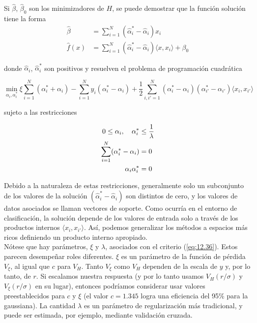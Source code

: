 Si $\hat{\beta}$, $\hat{\beta}_0$ son los minimizadores de $H$, se puede demostrar que la función solución tiene la forma 
\begin{align}
\hat{\beta} &= \sum_{i=1}^{N} (\hat{\alpha}^*_i - \hat{\alpha}_i) x_i \\
\hat{f}(x) &= \sum_{i=1}^{N} (\hat{\alpha}^*_i - \hat{\alpha}_i) \langle x, x_i \rangle + \beta_0 
\end{align}

\noindent donde $\hat{\alpha}_i$, $\hat{\alpha}^*_i$ son positivos y resuelven el problema de programación cuadrática

\begin{equation}
\min_{\alpha_i, \alpha^*_i} \xi \sum_{i=1}^{N} (\alpha^*_i + \alpha_i) - \sum_{i=1}^{N} y_i (\alpha^*_i - \alpha_i) + \frac{1}{2} \sum_{i,i'=1}^{N} (\alpha^*_i - \alpha_i)(\alpha^*_{i'} - \alpha_{i'}) \langle x_i, x_{i'} \rangle
\end{equation}

\noindent sujeto a las restricciones

\begin{align}
0 \leq \alpha_i, \quad \alpha^*_i &\leq \frac{1}{\lambda} \notag \\
\sum_{i=1}^{N} (\alpha^*_i - \alpha_i) &= 0 \\
\alpha_i \alpha^*_i &= 0 \notag 
\end{align}


Debido a la naturaleza de estas restricciones, generalmente solo un subconjunto de los valores de la solución $(\hat{\alpha}^*_i - \hat{\alpha}_i)$ son distintos de cero, y los valores de datos asociados se llaman vectores de soporte. Como ocurría en el entorno de clasificación, la solución depende de los valores de entrada solo a través de los productos internos $\langle x_i, x_{i'} \rangle$. Así, podemos generalizar los métodos a espacios más ricos definiendo un producto interno apropiado. \\

Nótese que hay parámetros, $\xi$ y $\lambda$, asociados con el criterio (\ref{eq:12.36}). Estos parecen desempeñar roles diferentes. $\xi$ es un parámetro de la función de pérdida $V_\xi$, al igual que $c$ para $V_H$. Tanto $V_\xi$ como $V_H$ dependen de la escala de $y$ y, por lo tanto, de $r$. Si escalamos nuestra respuesta (y por lo tanto usamos $V_H(r / \sigma)$ y $V_\xi(r / \sigma)$ en su lugar), entonces podríamos considerar usar valores preestablecidos para $c$ y $\xi$ (el valor $c = 1.345$ logra una eficiencia del 95\% para la gaussiana). La cantidad $\lambda$ es un parámetro de regularización más tradicional, y puede ser estimada, por ejemplo, mediante validación cruzada.

